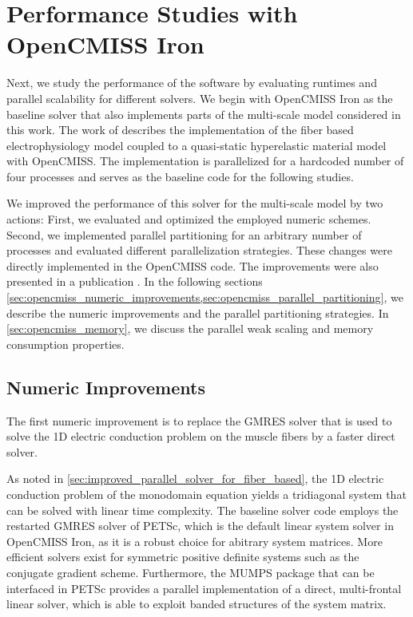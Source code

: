 
\section{Performance Studies with OpenCMISS Iron}

\iffalse
Next, we study the performance of the software by evaluating runtimes and parallel scalability for different solvers.
We begin with OpenCMISS Iron as the baseline solver that also implements parts of the multi-scale model considered in this work. The work of \cite{Heidlauf2013} describes the implementation of the fiber based electrophysiology model coupled to a quasi-static hyperelastic material model with OpenCMISS. The implementation is parallelized for a hardcoded number of four processes and serves as the baseline code for the following studies.

We improved the performance of this solver for the multi-scale model by two actions: First, we evaluated and optimized the employed numeric schemes. Second, we implemented parallel partitioning for an arbitrary number of processes and evaluated different parallelization strategies.
These changes were directly implemented in the OpenCMISS code. The improvements were also presented in a publication \cite{Bradley:2018:EDB}. In the following sections \cref{sec:opencmiss_numeric_improvements,sec:opencmiss_parallel_partitioning}, we describe the numeric improvements and the parallel partitioning strategies. In \cref{sec:opencmiss_memory}, we discuss the parallel weak scaling and memory consumption properties.

\subsection{Numeric Improvements}\label{sec:opencmiss_numeric_improvements}

The first numeric improvement is to replace the GMRES solver that is used to solve the 1D electric conduction problem on the muscle fibers
by a faster direct solver. 

As noted in \cref{sec:improved_parallel_solver_for_fiber_based}, the 1D electric conduction problem of the monodomain equation yields a tridiagonal system that can be solved with linear time complexity. The baseline solver code employs the restarted GMRES solver of PETSc, which is the default linear system solver in OpenCMISS Iron, as it is a robust choice for abitrary system matrices. 
More efficient solvers exist for symmetric positive definite systems such as the conjugate gradient scheme. 
Furthermore, the MUMPS package \cite{mumps2001} that can be interfaced in PETSc provides a parallel implementation of a direct, multi-frontal linear solver, which is able to exploit banded structures of the system matrix.

